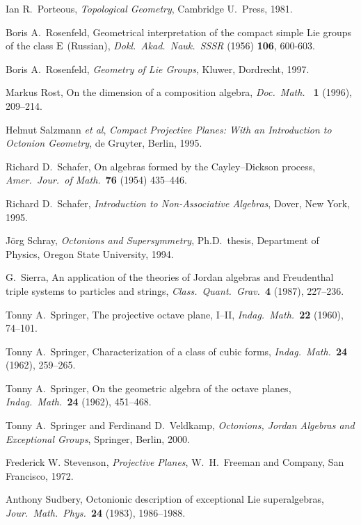 \begin{thebibliography}{10}
 Ian R.\ Porteous, {\sl Topological Geometry},    
Cambridge U.\ Press, 1981.   

 Boris A.\ Rosenfeld, Geometrical interpretation of
the compact simple Lie groups of the class ${\rm E}$ (Russian), {\sl
Dokl.\ Akad.\ Nauk.\ SSSR} (1956) {\bf 106}, 600-603.

 Boris A.\ Rosenfeld, {\sl Geometry of Lie Groups},    
Kluwer, Dordrecht, 1997.   

 Markus Rost, On the dimension of a composition algebra, 
{\sl Doc.\ Math.\ } {\bf 1} (1996), 209--214.  

 Helmut Salzmann {\it et al}, {\sl Compact Projective
Planes: With an Introduction to Octonion Geometry}, de Gruyter, Berlin,
1995.

 Richard D.\ Schafer, On algebras formed by the    
Cayley--Dickson process, {\sl Amer.\ Jour.\ of Math.\ }{\bf 76} (1954)   
435--446.   
  
 Richard D.\ Schafer, {\sl Introduction to Non-Associative 
Algebras}, Dover, New York, 1995.   

 J\"org Schray, {\sl Octonions and Supersymmetry},
Ph.D.\ thesis, Department of Physics, Oregon State University, 1994.
 
 G.\ Sierra, An application of the theories of Jordan 
algebras and Freudenthal triple systems to particles and strings,  
{\sl Class.\ Quant.\ Grav.\ }{\bf 4} (1987), 227--236.

 Tonny A.\ Springer, The projective octave plane, I--II, 
{\sl Indag.\ Math.\ }{\bf 22} (1960), 74--101. 
  
 Tonny A.\ Springer, Characterization of a class of
cubic forms, {\sl Indag.\ Math.\ }{\bf 24} (1962), 259--265.

 Tonny A.\ Springer, On the geometric algebra of 
the octave planes, {\sl Indag.\ Math.\ }{\bf 24} (1962), 451--468.
 
 Tonny A.\ Springer and Ferdinand D.\ Veldkamp,    
{\sl Octonions, Jordan Algebras and Exceptional Groups}, Springer,   
Berlin, 2000.   
 
 Frederick W. Stevenson, {\sl Projective Planes}, W.\ H.\ 
Freeman and Company, San Francisco, 1972. 
 
 Anthony Sudbery, Octonionic description of exceptional 
Lie superalgebras, {\sl Jour.\ Math.\ Phys.\ }{\bf 24} (1983), 1986--1988. 
 

\end{thebibliography}
